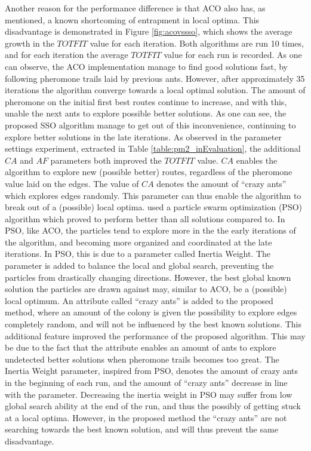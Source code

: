 Another reason for the performance difference is that ACO also has, as mentioned, a known shortcoming of entrapment in local optima. This disadvantage is demonstrated in Figure \ref{fig:acovssso}, which shows the average growth in the $TOTFIT$ value for each iteration. Both algorithms are run 10 times, and for each iteration the average $TOTFIT$ value for each run is recorded. As one can observe, the ACO implementation manage to find good solutions fast, by following pheromone trails laid by previous ants. However, after approximately 35 iterations the algorithm converge towards a local optimal solution. The amount of pheromone on the initial first best routes continue to increase, and with this, unable the next ants to explore possible better solutions. As one can see, the proposed SSO algorithm manage to get out of this inconvenience, continuing to explore better solutions in the late iterations. As observed in the parameter settings experiment, extracted in Table \vref{table:pm2_inEvaluation}, the additional $CA$ and $AF$ parameters both improved the $TOTFIT$ value. %
$CA$ enables the algorithm to explore new (possible better) routes, regardless of the pheromone value laid on the edges. The value of $CA$ denotes the amount of ``crazy ants'' which explores edges randomly. This parameter can thus enable the algorithm to break out of a (possible) local optima. \citet{kechagiopoulos14} used a particle swarm optimization (PSO) algorithm which proved to perform better than all solutions compared to. In PSO, like ACO, the particles tend to explore more in the the early iterations of the algorithm, and becoming more organized and coordinated at the late iterations. In PSO, this is due to a parameter called Inertia Weight. The parameter is added to balance the local and global search, preventing the particles from drastically changing directions. However, the best global known solution the particles are drawn against may, similar to ACO, be a (possible) local optimum. An attribute called ``crazy ants'' is added to the proposed method, where an amount of the colony is given the possibility to explore edges completely random, and will not be influenced by the best known solutions. This additional feature improved the performance of the proposed algorithm. This may be due to the fact that the attribute enables an amount of ants to explore undetected better solutions when pheromone trails becomes too great. The Inertia Weight parameter, inspired from PSO, denotes the amount of crazy ants in the beginning of each run, and the amount of ``crazy ants'' decrease in line with the parameter. Decreasing the inertia weight in PSO may suffer from low global search ability at the end of the run, and thus the possibly of getting stuck at a local optima. However, in the proposed method the ``crazy ants'' are not searching towards the best known solution, and will thus prevent the same disadvantage. 



